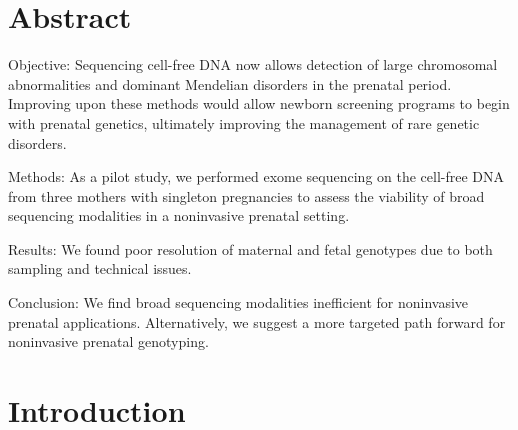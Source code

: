 \documentclass{article}\usepackage[]{graphicx}\usepackage[]{color}
\begin{document}
\section*{Abstract}

Objective: Sequencing cell-free DNA now allows detection of large chromosomal abnormalities and dominant Mendelian disorders in the prenatal period.
Improving upon these methods would allow newborn screening programs to begin with prenatal genetics, ultimately improving the management of rare genetic disorders.

Methods: As a pilot study, we performed exome sequencing on the cell-free DNA from three mothers with singleton pregnancies to assess the viability of broad sequencing modalities in a noninvasive prenatal setting.

Results: We found poor resolution of maternal and fetal genotypes due to both sampling and technical issues.

Conclusion: We find broad sequencing modalities inefficient for noninvasive prenatal applications.
Alternatively, we suggest a more targeted path forward for noninvasive prenatal genotyping.

\section{Introduction}
\end{document}
